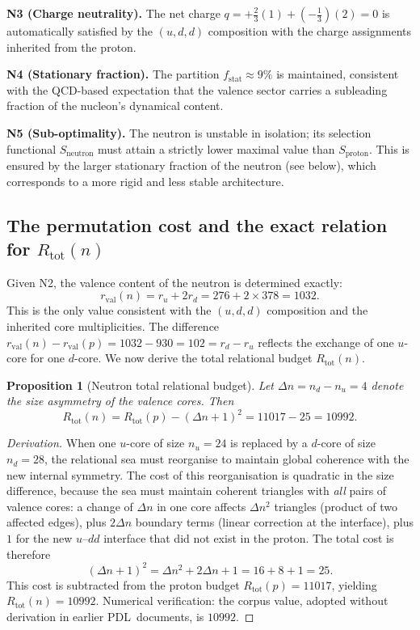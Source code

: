 \documentclass[11pt,a4paper]{article}
\newtheorem{proposition}[theorem]{Proposition}
\theoremstyle{definition}
\newcommand{\PDL}{\textnormal{PDL}}
\newcommand{\Rtot}{R_{\mathrm{tot}}}
\newcommand{\rval}{r_{\mathrm{val}}}
\newcommand{\fstat}{f_{\mathrm{stat}}}
\begin{document}
\medskip\noindent\textbf{N3 (Charge neutrality).} The net charge $q = +\tfrac{2}{3}(1) + (-\tfrac{1}{3})(2) = 0$ is automatically satisfied by the $(u,d,d)$ composition with the charge assignments inherited from the proton.

\medskip\noindent\textbf{N4 (Stationary fraction).} The partition $\fstat \approx 9\%$ is maintained, consistent with the QCD-based expectation that the valence sector carries a subleading fraction of the nucleon's dynamical content.

\medskip\noindent\textbf{N5 (Sub-optimality).} The neutron is unstable in isolation; its selection functional $S_{\mathrm{neutron}}$ must attain a strictly lower maximal value than $S_{\mathrm{proton}}$. This is ensured by the larger stationary fraction of the neutron (see below), which corresponds to a more rigid and less stable architecture.\cite{Combinatorial_Proton_v2_2026}

\subsection{The permutation cost and the exact relation for \texorpdfstring{$\Rtot(n)$}{Rtot(n)}}
\label{subsec:permutation_cost}

Given N2, the valence content of the neutron is determined exactly:
\[
\rval(n) = r_u + 2r_d = 276 + 2 \times 378 = 1032.
\]
This is the only value consistent with the $(u,d,d)$ composition and the inherited core multiplicities. The difference $\rval(n) - \rval(p) = 1032 - 930 = 102 = r_d - r_u$ reflects the exchange of one $u$-core for one $d$-core. We now derive the total relational budget $\Rtot(n)$.

\begin{proposition}[Neutron total relational budget]
\label{prop:neutron_Rtot}
Let $\Delta n = n_d - n_u = 4$ denote the size asymmetry of the valence cores. Then
\[
\Rtot(n) = \Rtot(p) - (\Delta n + 1)^2 = 11017 - 25 = 10992.
\]
\end{proposition}

\begin{proof}[Derivation]
When one $u$-core of size $n_u = 24$ is replaced by a $d$-core of size $n_d = 28$, the relational sea must reorganise to maintain global coherence with the new internal symmetry. The cost of this reorganisation is quadratic in the size difference, because the sea must maintain coherent triangles with \emph{all} pairs of valence cores: a change of $\Delta n$ in one core affects $\Delta n^2$ triangles (product of two affected edges), plus $2\Delta n$ boundary terms (linear correction at the interface), plus $1$ for the new $u$--$dd$ interface that did not exist in the proton. The total cost is therefore
\[
(\Delta n + 1)^2 = \Delta n^2 + 2\Delta n + 1 = 16 + 8 + 1 = 25.
\]
This cost is subtracted from the proton budget $\Rtot(p) = 11017$, yielding $\Rtot(n) = 10992$. Numerical verification: the corpus value, adopted without derivation in earlier \PDL\ documents, is $10992$.\cite{PDL_Main_2026}
\end{proof}
\end{document}
